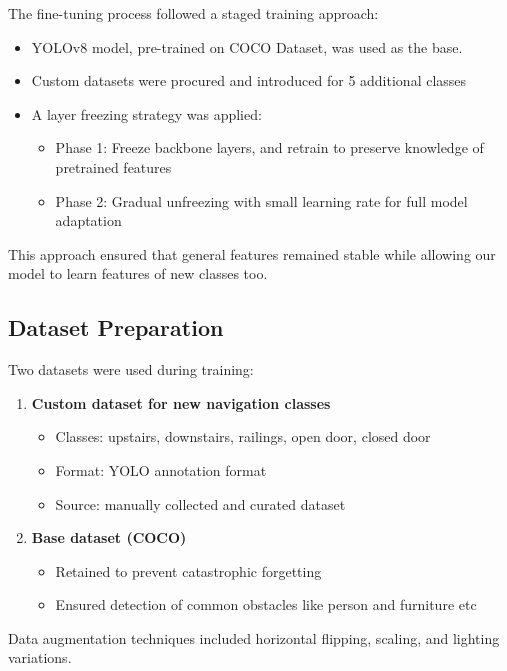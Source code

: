 \documentclass{FastFyp}
\begin{document}
The fine-tuning process followed a staged training approach:

\begin{itemize}
    \item YOLOv8 model, pre-trained on COCO Dataset, was used as the base.
    \item Custom datasets were procured and introduced for 5 additional classes
    \item A layer freezing strategy was applied:
    \begin{itemize}
        \item Phase 1: Freeze backbone layers, and retrain to preserve knowledge of pretrained features
        \item Phase 2: Gradual unfreezing with small learning rate for full model adaptation
    \end{itemize}
\end{itemize}

This approach ensured that general features remained stable while allowing our model to learn features of new classes too.

\subsection{Dataset Preparation}

Two datasets were used during training:

\begin{enumerate}
    \item \textbf{Custom dataset for new navigation classes}
    \begin{itemize}
        \item Classes: upstairs, downstairs, railings, open door, closed door
        \item Format: YOLO annotation format
        \item Source: manually collected and curated dataset
    \end{itemize}
    
    \item \textbf{Base dataset (COCO)}
    \begin{itemize}
        \item Retained to prevent catastrophic forgetting
        \item Ensured detection of common obstacles like person and furniture etc
    \end{itemize}
\end{enumerate}

Data augmentation techniques included horizontal flipping, scaling, and lighting variations.
\end{document}
